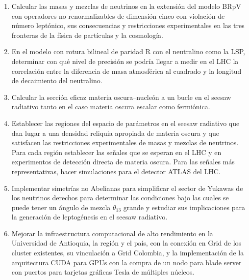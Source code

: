 \begin{enumerate}
\item 
\begin{bbrpvlhc}
  Calcular las masas y mezclas de neutrinos en la extensión del modelo
  BRpV con operadores no renormalizables de dimensión cinco con
  violación de número leptónico, sus consecuencias y restricciones
  experimentales en las tres fronteras de la física de partículas y la
  cosmología.
\end{bbrpvlhc}
\label{item:bbrpvlhc1}
\item 
\begin{brpvlhc}  
  En el modelo con rotura bilineal de paridad R con el neutralino
  como la LSP, determinar con qué nivel de precisión se podría llegar
  a medir en el LHC la correlación entre la diferencia de masa
  atmosférica al cuadrado y la longitud de decaimiento del neutralino.
\end{brpvlhc}
\label{item:bbrpvlhc2}
\item 
\begin{darkmatter}
  Calcular la sección eficaz materia oscura--nucleón a un bucle en el
  seesaw radiativo tanto en el caso materia oscura escalar como
  fermiónica.
\end{darkmatter}

\item 
\begin{darkmatter}
  Establecer las regiones del espacio de parámetros en el seesaw
  radiativo que dan lugar a una densidad reliquia apropiada
  de materia oscura y que satisfacen las restricciones
  experimentales de masas y mezclas de neutrinos. Para cada región
  establecer las señales que se esperan en el LHC y en experimentos de
  detección directa de materia oscura.  Para las señales más
  representativas, hacer simulaciones para el detector ATLAS del LHC.
\end{darkmatter}
\label{item:darkmatter1}

\item 
\begin{darkmatter}
  Implementar simetrías no Abelianas para simplificar el sector de
  Yukawas de los neutrinos derechos para determinar las condiciones
  bajo las cuales se puede tener un ángulo de mezcla $\theta_{13}$
  grande y estudiar sus implicaciones para la generación de
  leptogénesis en el seesaw radiativo.
\end{darkmatter}
\label{item:darkmatter2}

\item Mejorar la infraestructura computacional de alto rendimiento en
  la Universidad de Antioquia, la región y el país, con la conexión en
  Grid de los cluster existentes, su vinculación a Grid Colombia, y la
  implementación de la arquitectura CUDA para GPUs con la compra de un
  nodo para blade server con puertos para tarjetas gráficas Tesla de
  múltiples núcleos.
\label{item:grid}
\end{enumerate}

